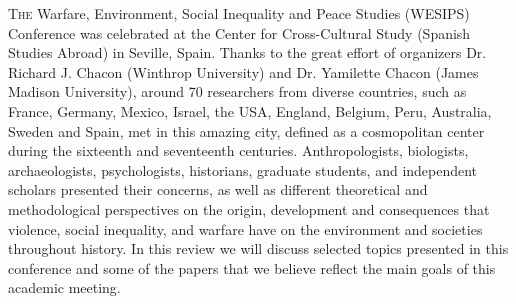 	
\lettrine[nindent=0em,lines=3]{T}{he} Warfare, Environment, Social Inequality and Peace Studies (WESIPS) Conference was celebrated at the Center for Cross-Cultural Study (Spanish Studies Abroad) in Seville, Spain. Thanks to the great effort of organizers Dr. Richard J. Chacon (Winthrop University) and Dr. Yamilette Chacon (James Madison University), around 70 researchers from diverse countries, such as France, Germany, Mexico, Israel, the USA, England, Belgium, Peru, Australia, Sweden and Spain, met in this amazing city, defined as a cosmopolitan center during the sixteenth and seventeenth centuries. Anthropologists, biologists, archaeologists, psychologists, historians, graduate students, and independent scholars presented their concerns, as well as different theoretical and methodological perspectives on the origin, development and consequences that violence, social inequality, and warfare have on the environment and societies throughout history. In this review we will discuss selected topics presented in this conference and some of the papers that we believe reflect the main goals of this academic meeting. 


